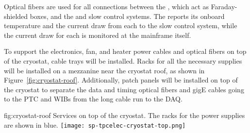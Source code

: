 Optical fibers are used for all connections between the , which act as
Faraday-shielded boxes, and the  and slow control systems.  The  reports
its onboard temperature and the current draw from each  to the slow control system, while the
current draw for each  is monitored at the mainframe itself.

To support the electronics, fan, and heater power cables and optical fibers on top of the cryostat, 
cable trays will be installed. Racks for all the necessary  supplies will be installed on a mezzanine
near the cryostat roof, as shown in Figure~\ref{fig:cryostat-roof}.
Additionally, patch panels will be installed on top of the cryostat to separate the data and timing optical fibers and gigE
cables going to the PTC and WIBs from the long cable run to the DAQ.

\begin{dunefigure}
{fig:cryostat-roof}
{Services on top of the cryostat. The racks for the  power supplies are shown in blue.}
\texttt{[image: sp-tpcelec-cryostat-top.png]}
\end{dunefigure}
